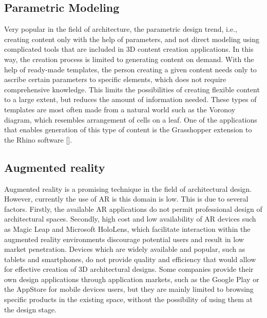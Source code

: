 \documentclass[runningheads]{llncs}
\begin{document}
\subsection{Parametric Modeling}
Very popular in the field of architecture, the parametric design trend, i.e., creating content only with the help of parameters, and not direct modeling using complicated tools that are included in 3D content creation applications. In this way, the creation process is limited to generating content on demand. With the help of ready-made templates, the person creating a given content needs only to ascribe certain parameters to specific elements, which does not require comprehensive knowledge. This limits the possibilities of creating flexible content to a large extent, but reduces the amount of information needed. These types of templates are most often made from a natural world such as the Voronoy diagram, which resembles arrangement of cells on a leaf. One of the applications that enables generation of this type of content is the Grasshopper extension to the Rhino software [].

\subsection{Augmented reality}
Augmented reality is a promising technique in the field of architectural design. However, currently the use of AR is this domain is low. This is due to several factors. Firstly, the available AR applications do not permit professional design of architectural spaces. Secondly, high cost and low availability of AR devices such as Magic Leap and Microsoft HoloLens, which facilitate interaction within the augmented reality environments discourage potential users and result in low market penetration. Devices which are widely available and popular, such as tablets and smartphones, do not provide quality and efficiency that would allow for effective creation of 3D architectural designs. Some companies provide their own design applications through application markets, such as the Google Play or the AppStore for mobile devices users, but they are mainly limited to browsing specific products in the existing space, without the possibility of using them at the design stage.
\end{document}
